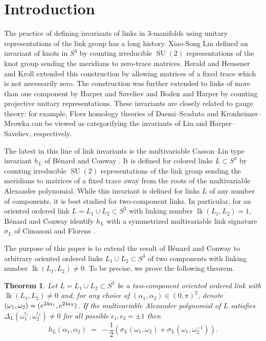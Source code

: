\documentclass[11pt,reqno]{amsart}
\newtheorem{theorem}{Theorem}[section]
\theoremstyle{definition}
\renewcommand{\i}{\mspace{1.5mu}\mathbf i}
\newcommand{\lk}{\operatorname{lk}}
\newcommand{\SU}{\operatorname{SU}}
\begin{document}
\begin{sloppypar}

\section{Introduction}
	
The practice of defining invariants of links in $3$-manifolds using unitary representations of the link group has a long history. Xiao-Song Lin \cite{Lin} defined an invariant of knots in $S^3$ by counting irreducible $\SU(2)$ representations of the knot group sending the meridians to zero-trace matrices. Herald \cite{Herald} and Heusener and Kroll \cite{Heusener-Kroll} extended this construction by allowing matrices of a fixed trace which is not necessarily zero. The construction was further extended to links of more than one component by Harper and Saveliev \cite{Harper-Saveliev} and Boden and Harper \cite{Boden-Harper} by counting projective unitary representations. These invariants are closely related to gauge theory: for example, Floer homology theories of Daemi--Scaduto \cite{Daemi-Scaduto} and Kronheimer--Mrowka \cite{Kronheimer-Mrowka} can be viewed as categorifying the invariants of Lin and Harper--Saveliev, respectively. {\par}

The latest in this line of link invariants is the multivariable Casson--Lin type invariant $h_L$ of Bénard and Conway \cite{Benard-Conway}. It is defined for colored links $L \subset S^3$ by counting irreducible $\SU(2)$ representations of the link group sending the meridians to matrices of a fixed trace away from the roots of the multivariable Alexander polynomial. While this invariant is defined for links $L$ of any number of components, it is best studied for two-component links. In particular, for an oriented ordered link $L = L_1 \cup L_2 \subset S^3$ with linking number $\lk(L_1, L_2) = 1$, Bénard and Conway \cite[Theorem 1.1]{Benard-Conway} identify $h_L$ with a symmetrized multi\-variable link signature $\sigma_L$ of Cimasoni and Florens \cite{Cimasoni-Florens}. 
	
The purpose of this paper is to extend the result of Bénard and Conway to arbitrary oriented ordered links $L_1 \cup L_2 \subset S^3$ of two components with linking number $\lk(L_1, L_2) \neq 0$. To be precise, we prove the following theorem. 
	
\begin{theorem}
Let $L = L_1 \cup L_2 \subset S^3$ be a two-component oriented ordered link with $\lk(L_1, L_2) \neq 0$ and, for any choice of $(\alpha_1, \alpha_2) \in (0, \pi)^2$, denote $(\omega_1, \omega_2) = (e^{2 \i \alpha_1}, e^{2 \i \alpha_2})$. If the multivariable Alexander polynomial of $L$ satisfies $\Delta_L (\omega_1^{\epsilon_1}, \omega_2^{\epsilon_2}) \neq 0$ for all possible $\epsilon_1,\epsilon_2 = \pm 1$ then
\begin{equation}\label{E:main}
h_L(\alpha_1, \alpha_2) \; = \; - \frac{1}{2} \left(\sigma_L \left( \omega_1, \omega_2 \right) + \sigma_L \left( \omega_1, \omega^{- 1}_2 \right) \right).
\end{equation}
\end{theorem}


\end{sloppypar}
\end{document}
